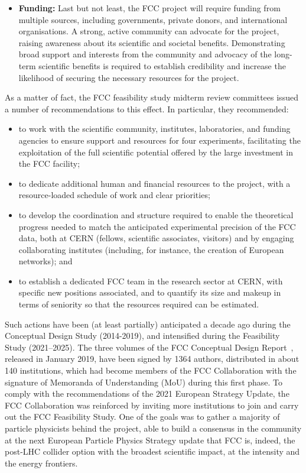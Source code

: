 \begin{itemize}
By creating a strong, multi-generational community, the project ensures that these long-term benefits are recognised, advocated for, and maximised over time.
\item {\bf Funding:}
Last but not least, the FCC project will require funding from multiple sources, including governments, private donors, and international organisations. 
A strong, active community can advocate for the project, raising awareness about its scientific and societal benefits. 
Demonstrating broad support and interests from the community and advocacy of the long-term scientific benefits is required to establish credibility and increase the likelihood of securing the necessary resources for the project.
\end{itemize}

As a matter of fact, the FCC feasibility study midterm review committees issued a number of recommendations to this effect. 
In particular, they recommended:

\begin{itemize}
\item to work with the scientific community, institutes, laboratories, and funding agencies to ensure support and resources for four experiments, facilitating the exploitation of the full scientific potential offered by the large investment in the FCC facility;
\item to dedicate additional human and financial resources to the project, with a resource-loaded schedule of work and clear priorities;
\item to develop the coordination and structure required to enable the theoretical progress needed to match the anticipated experimental precision of the FCC data, both at CERN (fellows, scientific associates, visitors) and by engaging collaborating institutes (including, for instance, the creation of European networks); and
\item to establish a dedicated FCC team in the research sector at CERN, with specific new positions associated, and to quantify its size and makeup in terms of seniority so that the resources required can be estimated.
\end{itemize}

Such actions have been (at least partially) anticipated a decade ago during the Conceptual Design Study (2014-2019), and intensified during the Feasibility Study (2021--2025). 
The three volumes of the FCC Conceptual Design Report~\cite{fcc-phys-cdr,fcc-ee-cdr,FCC-hhCDR}, released in January 2019, have been signed by 1364 authors, distributed in about 140 institutions, which had become members of the FCC Collaboration with the signature of Memoranda of Understanding (MoU) during this first phase. 
To comply with the recommendations of the 2021 European Strategy Update, the FCC Collaboration was reinforced by inviting more institutions to join and carry out the FCC Feasibility Study. 
One of the goals was to gather a majority of particle physicists behind the project, able to build a consensus in the community at the next European Particle Physics Strategy update that FCC is, indeed, the post-LHC collider option with the broadest scientific impact, at the intensity and the energy frontiers. 


